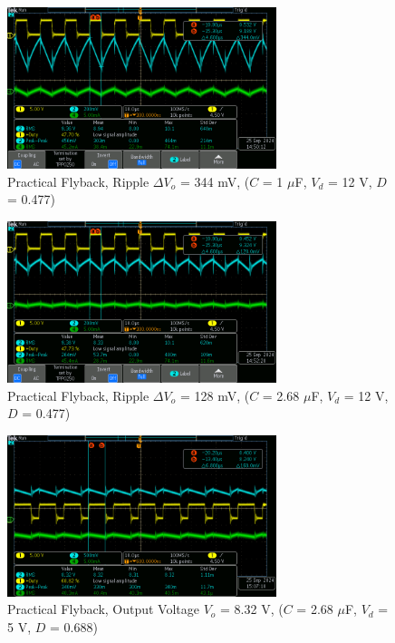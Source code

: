 \documentclass[12pt,twoside]{scrartcl}
\begin{document}
\begin{figure}[htp]
    \centering
    \includegraphics[width=0.7\textwidth]{Flyback/tek0001.png}
    \caption{Practical Flyback, Ripple $\Delta V_o$ = 344 mV, ($C$ = 1 $\mu$F, $V_d$ = 12 V, $D$ = 0.477)}
    \label{fig:Practical1}
\end{figure}

\begin{figure}[htp]
    \centering
    \includegraphics[width=0.7\textwidth]{Flyback/tek0002.png}
    \caption{Practical Flyback, Ripple $\Delta V_o$ = 128 mV, ($C$ = 2.68 $\mu$F, $V_d$ = 12 V, $D$ = 0.477)}
    \label{fig:Practical2}
\end{figure}

\begin{figure}[htp]
    \centering
    \includegraphics[width=0.7\textwidth]{Flyback/tek0003.png}
    \caption{Practical Flyback, Output Voltage $V_o$ = 8.32 V, ($C$ = 2.68 $\mu$F, $V_d$ = 5 V, $D$ = 0.688)}
    \label{fig:Practical3}
\end{figure}
\end{document}
